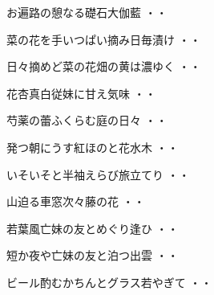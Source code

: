 \begin{shiika}お遍路の憩なる礎石大伽藍
\hfill{・・}\end{shiika}
\vspace{0.6cm}
\begin{shiika}菜の花を手いつぱい摘み日毎漬け
\hfill{・・}\end{shiika}
\vspace{0.6cm}
\begin{shiika}日々摘めど菜の花畑の黄は濃ゆく
\hfill{・・}\end{shiika}
\vspace{0.6cm}
\begin{shiika}花杏真白従妹に甘え気味
\hfill{・・}\end{shiika}
\vspace{0.6cm}
\begin{shiika}芍薬の蕾ふくらむ庭の日々
\hfill{・・}\end{shiika}
\vspace{0.6cm}
\begin{shiika}発つ朝にうす紅ほのと花水木
\hfill{・・}\end{shiika}
\vspace{0.6cm}
\begin{shiika}いそいそと半袖えらび旅立てり
\hfill{・・}\end{shiika}
\vspace{0.6cm}
\begin{shiika}山迫る車窓次々藤の花
\hfill{・・}\end{shiika}
\vspace{0.6cm}
\begin{shiika}若葉風亡妹の友とめぐり逢ひ
\hfill{・・}\end{shiika}
\vspace{0.6cm}
\begin{shiika}短か夜や亡妹の友と泊つ出雲
\hfill{・・}\end{shiika}
\vspace{0.6cm}
\begin{shiika}ビール酌むかちんとグラス若やぎて
\hfill{・・}\end{shiika}
\vspace{0.6cm}
